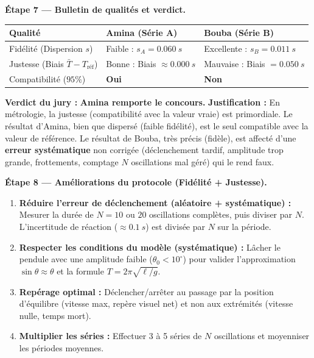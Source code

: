 \documentclass[11pt]{article}
\begin{document}
\begin{exoresolu}
\textbf{Étape 7 — Bulletin de qualités et verdict.}

\begin{center}
\begin{tabularx}{\linewidth}{|l|X|X|}
\hline
\rowcolor{popblueL} Qualité & Amina (Série A) & Bouba (Série B) \\
\hline
Fidélité (Dispersion $s$) & Faible : $s_A = \SI{0,060}{s}$ & Excellente : $s_B = \SI{0,011}{s}$ \\
\hline
Justesse (Biais $\bar{T}-T_{\text{réf}}$) & Bonne : Biais $\approx \SI{0,000}{s}$ & Mauvaise : Biais $= \SI{+0,050}{s}$ \\
\hline
Compatibilité ($95\%$) & \textbf{Oui} & \textbf{Non} \\
\hline
\end{tabularx}
\end{center}

\textbf{Verdict du jury :} \textbf{Amina remporte le concours.}
\textbf{Justification :} En métrologie, la justesse (compatibilité avec la valeur vraie) est primordiale. Le résultat d'Amina, bien que dispersé (faible fidélité), est le seul compatible avec la valeur de référence. Le résultat de Bouba, très précis (fidèle), est affecté d'une \textbf{erreur systématique} non corrigée (déclenchement tardif, amplitude trop grande, frottements, comptage $N$ oscillations mal géré) qui le rend faux.

\textbf{Étape 8 — Améliorations du protocole (Fidélité + Justesse).}
\begin{enumerate}
\item \textbf{Réduire l'erreur de déclenchement (aléatoire + systématique) :} Mesurer la durée de $N=10$ ou $20$ oscillations complètes, puis diviser par $N$. L'incertitude de réaction ($\approx \SI{0,1}{s}$) est divisée par $N$ sur la période.
\item \textbf{Respecter les conditions du modèle (systématique) :} Lâcher le pendule avec une amplitude faible ($\theta_0 < 10^\circ$) pour valider l'approximation $\sin\theta \approx \theta$ et la formule $T=2\pi\sqrt{\ell/g}$.
\item \textbf{Repérage optimal :} Déclencher/arrêter au passage par la position d'équilibre (vitesse max, repère visuel net) et non aux extrémités (vitesse nulle, temps mort).
\item \textbf{Multiplier les séries :} Effectuer 3 à 5 séries de $N$ oscillations et moyenniser les périodes moyennes.
\end{enumerate}
\end{exoresolu}
\end{document}
